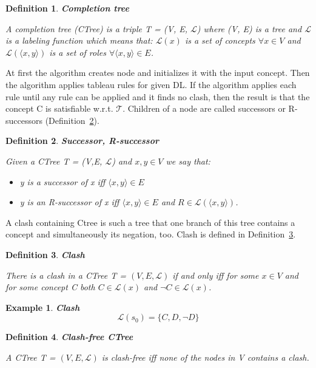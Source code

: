\documentclass[12pt,a4paper]{article}
\newtheorem{definition}{Definition}[subsection]
\newtheorem{example}{Example}[subsection]
\begin{document}
\begin{definition}{\textbf{Completion tree}}
	\label{def:ctree}

	A completion tree (CTree) is a triple T = (V, E, $\mathcal{L}$) where (V, E)
	is a tree and $\mathcal{L}$ is a labeling function which means that:
	$\mathcal{L}(x)$ is a set of concepts $\forall x \in V$ and
	$\mathcal{L}(\langle x, y \rangle )$ is a set of roles $\forall \langle x, y \rangle \in E$.	
\end{definition}

At first the algorithm creates node and initializes it with the input concept.
Then the algorithm applies tableau rules for given DL. If the algorithm applies each rule until any rule can be applied and it finds no clash, then the result is that the concept C is satisfiable w.r.t. $\mathcal{T}$. Children of a node are called successors or R-successors (Definition~\ref{def:successor}).

\begin{definition}{\textbf{Successor, R-successor}}
	\label{def:successor}

	Given a CTree T = (V,E, $\mathcal{L}$) and $x,y \in V$ we say that: 
	\begin{itemize}
		\item y is a successor of x iff $\langle x,y \rangle \in E$
		\item y is an R-successor of x iff $\langle x,y \rangle \in E$ and $R \in \mathcal{L}(\langle x,y \rangle)$.
	\end{itemize}
\end{definition}

A clash containing Ctree is such a tree that one branch of this tree contains a concept and simultaneously its negation, too. Clash is defined in Definition~\ref{def:clash}.

\begin{definition}{\textbf{Clash}}
	\label{def:clash}

	There is a clash in a CTree T = $(V,E, \mathcal{L})$ if and only iff for some $x \in V$ and for some concept C both $C \in \mathcal{L}(x)$ and $\neg C \in \mathcal{L}(x)$.
\end{definition}

\begin{example}{\textbf{Clash}}
	\[ \mathcal{L}(s_{0}) = \{ C, D, \neg D \} \]
\end{example}

\begin{definition}{\textbf{Clash-free CTree}}

A CTree T = $(V,E, \mathcal{L})$ is clash-free iff none of the nodes in V contains a clash.
\end{definition}
\end{document}
